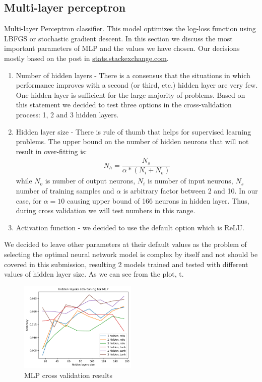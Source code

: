 \documentclass[12pt]{article}
\begin{document}
\subsection{Multi-layer perceptron}
Multi-layer Perceptron classifier. This model optimizes the log-loss function using LBFGS or stochastic gradient descent. In this section we discuss the most important parameters of MLP and the values we have chosen. Our decisions mostly based on the post in \href{https://stats.stackexchange.com/questions/181/how-to-choose-the-number-of-hidden-layers-and-nodes-in-a-feedforward-neural-netw}{stats.stackexchange.com}.
\begin{enumerate}
	\item Number of hidden layers - There is a consensus that the situations in which performance improves with a second (or third, etc.) hidden layer are very few. One hidden layer is sufficient for the large majority of problems. Based on this statement we decided to test three options in the cross-validation process: 1, 2 and 3 hidden layers.
	\item Hidden layer size - There is rule of thumb that helps for supervised learning problems. The upper bound on the number of hidden neurons that will not result in over-fitting is:
\begin{gather*}
N_h = \dfrac{N_s}{\alpha * (N_i + N_o)}
\end{gather*}
while $N_o$ is number of output neurons, $N_i$ is number of input neurons, $N_s$ number of training samples and $\alpha$ is arbitrary factor between 2 and 10. In our case, for $\alpha = 10$ 
causing upper bound of 166 neurons in hidden layer. Thus, during cross validation we will test numbers in this range.
	\item Activation function - we decided to use the default option which is ReLU.
\end{enumerate}

We decided to leave other parameters at their default values as the problem of selecting the optimal neural network model is complex by itself and not should be covered in this submission, resulting 2 models trained and tested with different values of hidden layer size. As we can see from the plot, t.  

\begin{figure}[h]
\centering
\includegraphics[width=0.5\textwidth]{Cross_valid_plots/mlp_h_fig}
\caption{MLP cross validation results}
\end{figure}
\end{document}

